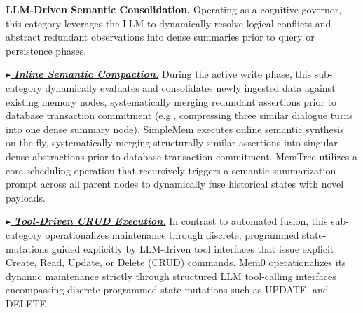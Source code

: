 \documentclass{llmxive}
\providecommand{\llm}{\textsc{LLM}\xspace}
\begin{document}


\noindent  \textbf{\llm-Driven Semantic Consolidation.}
Operating as a cognitive governor, this category leverages the \llm to dynamically resolve logical conflicts and abstract redundant observations into dense summaries prior to query or persistence phases.

\begin{sloppypar}
\noindent \underline{\textit{$\blacktriangleright$ \textbf{Inline Semantic Compaction}.}}
During the active write phase, this sub-category dynamically evaluates and consolidates newly ingested data against existing memory nodes, systematically merging redundant assertions prior to database transaction commitment (e.g., compressing three similar dialogue turns into one dense summary node).
SimpleMem executes online semantic synthesis on-the-fly, systematically merging structurally similar assertions into singular dense abstractions prior to database transaction commitment. MemTree utilizes a core scheduling operation that recursively triggers a semantic summarization prompt across all parent nodes to dynamically fuse historical states with novel payloads.
\end{sloppypar}


\begin{sloppypar}
\noindent \underline{\textit{$\blacktriangleright$ \textbf{Tool-Driven CRUD Execution}.}}
In contrast to automated fusion, this sub-category operationalizes maintenance through discrete, programmed state-mutations guided explicitly by \llm-driven tool interfaces that issue explicit Create, Read, Update, or Delete (CRUD) commands. Mem0 operationalizes its dynamic maintenance strictly through structured \llm tool-calling interfaces encompassing discrete programmed state-mutations such as UPDATE, and DELETE.
\end{sloppypar}
\end{document}
